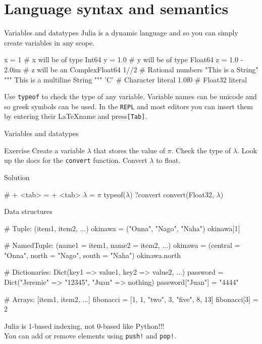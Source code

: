 \documentclass{beamer}
\newenvironment{Boxx}{\begin{tcolorbox}[standard jigsaw, opacityframe=0.8, opacityback=0.0]}{\end{tcolorbox}}
\begin{document}
\section{Language syntax and semantics}
\begin{frame}[fragile]{Variables and datatypes}
  Julia is a dynamic language and so you can simply create variables in any scope.
  \begin{Boxx}
  \begin{jllisting}
  x = 1   # x will be of type Int64
  y = 1.0 # y will be of type Float64
  z = 1.0 - 2.0im # z will be an Complex{Float64}
  1//2 # Rational numbers
  "This is a String"
  """
  This is a multiline
  String
  """
  'C' # Character literal
  1.0f0 # Float32 literal
  \end{jllisting}
\end{Boxx}
  Use \verb|typeof| to check the type of any variable. Variable names can be unicode and so greek symbols can be used.
  In the \verb|REPL| and most editors you can insert them by entering their \LaTeX name and press\verb|[Tab]|.
\end{frame}

\begin{frame}[fragile]{Variables and datatypes}
	
	\begin{block}{Exercise}
		Create a variable $\lambda$ that stores the value of $\pi$.
		Check the type of $\lambda$.
		Look up the docs for the \verb|convert| function.
		Convert $\lambda$ to float.
	\end{block}
	\vfill
	\begin{block}{Solution}
		\begin{jllisting}[mathescape]
  # \lambda + <tab> = \pi + <tab>
  $\lambda$ = $\pi$
  typeof($\lambda$)
  ?convert
  convert(Float32, $\lambda$)
		\end{jllisting}
	\end{block}
\end{frame}


\begin{frame}[fragile]{Data structures}
	\begin{Boxx}
	\begin{jllisting}
  # Tuple: (item1, item2, ...)
  okinawa = ("Onna", "Nago", "Naha")
  okinawa[1] 
		
  # NamedTuple: (name1 = item1, name2 = item2, ...)
  okinawa = (central = "Onna", north = "Nago", south = "Naha")
  okinawa.north 
		
  # Dictionaries: Dict(key1 => value1, key2 => value2, ...)
  password = Dict("Jeremie" => "12345", "Juan" => nothing)
  password["Juan"] = "4444"
		
  # Arrays: [item1, item2, ...]
  fibonacci = [1, 1, "two", 3, "five", 8, 13]
  fibonacci[3] = 2
	\end{jllisting}
\end{Boxx}

Julia is 1-based indexing, not 0-based like Python!!!\\
You can add or remove elements using \verb|push!| and \verb|pop!|.
\end{frame}
\end{document}
